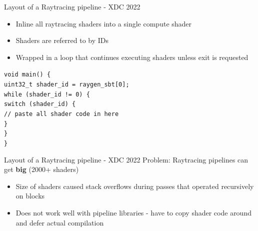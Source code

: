 \documentclass[aspectratio=169,t]{beamer}
\begin{document}
\begin{slide}{Layout of a Raytracing pipeline - XDC 2022}
\begin{itemize}
 \item Inline all raytracing shaders into a single compute shader
 \item Shaders are referred to by IDs
 \item Wrapped in a loop that continues executing shaders unless exit is requested
\end{itemize}

  \texttt{void main() \{ \\
  \hspace*{8pt}uint32\_t shader\_id = raygen\_sbt[0]; \\
  \hspace*{8pt}while (shader\_id != 0) \{ \\
  \hspace*{16pt}switch (shader\_id) \{ \\
  \hspace*{24pt}// paste all shader code in here \\
  \hspace*{16pt}\} \\
  \hspace*{8pt}\} \\
  \}} \\
\end{slide}

\begin{slide}{Layout of a Raytracing pipeline - XDC 2022}
 Problem: Raytracing pipelines can get \textbf{big} (2000+ shaders)
 \begin{itemize}
  \item Size of shaders caused stack overflows during passes that operated recursively on blocks
  \item Does not work well with pipeline libraries - have to copy shader code around and defer actual compilation
 \end{itemize}
\end{slide}
\end{document}

